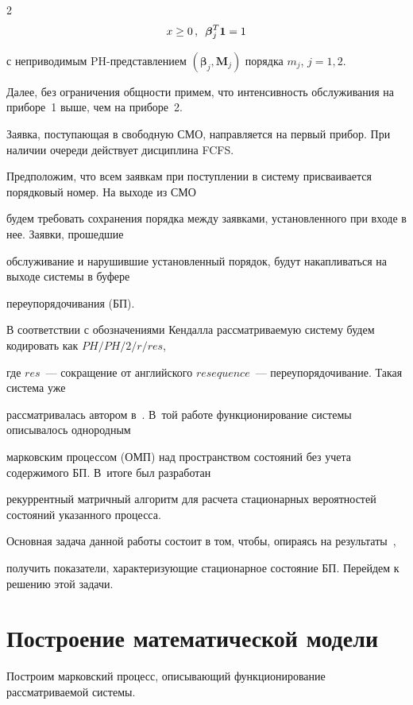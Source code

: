 \begin{multicols}{2}
\begin{equation*}
x\geq 0\,,\enskip \boldsymbol{\beta}_j^T\boldsymbol{1}=1

\end{equation*}

с неприводимым PH-представлением $(\boldsymbol{\beta}_j,\boldsymbol{M}_j)$ порядка $m_j$, $j=1,2$.



Далее, без ограничения общности примем, что интенсивность обслуживания на приборе~1 выше, чем на приборе~2. 

Заявка, поступающая в свободную СМО, направляется на первый прибор. При наличии очереди действует дисциплина FCFS.



Предположим, что всем заявкам при поступлении в систему присваивается порядковый номер. На выходе из СМО 

будем требовать сохранения порядка между заявками, установленного при входе в нее. Заявки, прошедшие 

обслуживание и нарушившие установленный порядок, будут накапливаться на выходе системы в  буфере 

переупорядочивания (БП).



В соответствии с обозначениями Кендалла рассматриваемую систему будем кодировать как $PH/PH/2/r/res$, 

где $res$~--- сокращение от английского $resequence$~--- переупорядочивание. Такая сис\-те\-ма уже 

рассматривалась автором в~\cite{2mat}. В~той работе функционирование системы описывалось однородным 

марковским процессом (ОМП) над пространством состояний без учета содержимого БП. В~итоге был разработан 

рекуррентный матричный алгоритм для расчета стационарных вероятностей состояний указанного процесса. 

Основная задача данной работы состоит в том, чтобы, опираясь на результаты~\cite{2mat}, 

получить показатели, характеризующие стационарное состояние БП. Перейдем к решению этой задачи.



\section{Построение математической модели}



Построим марковский процесс, описывающий функционирование рассматриваемой системы. 


\end{multicols}
